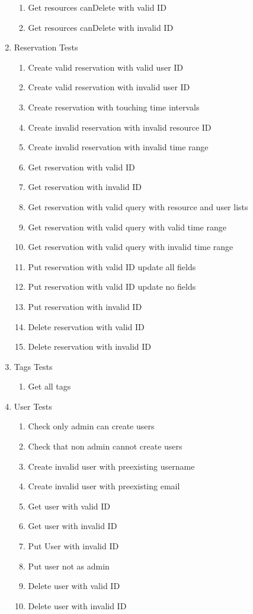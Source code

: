 \documentclass[12pt]{article}
\begin{document}
\begin{enumerate}
\begin{enumerate}
		\item Get resources canDelete with valid ID
		\item Get resources canDelete with invalid ID
	\end{enumerate}
	\item Reservation Tests
	\begin{enumerate}
		\item Create valid reservation with valid user ID
		\item Create valid reservation with invalid user ID
		\item Create reservation with touching time intervals
		\item Create invalid reservation with invalid resource ID
		\item Create invalid reservation with invalid time range
		\item Get reservation with valid ID
		\item Get reservation with invalid ID
		\item Get reservation with valid query with resource and user lists
		\item Get reservation with valid query with valid time range
		\item Get reservation with valid query with invalid time range
		\item Put reservation with valid ID update all fields
		\item Put reservation with valid ID update no fields
		\item Put reservation with invalid ID
		\item Delete reservation with valid ID
		\item Delete reservation with invalid ID
	\end{enumerate}
	\item Tags Tests
	\begin{enumerate}
		\item Get all tags
	\end{enumerate}
	\item User Tests
	\begin{enumerate}
		\item Check only admin can create users
		\item Check that non admin cannot create users
		\item Create invalid user with preexisting username
		\item Create invalid user with preexisting email 
		\item Get user with valid ID
		\item Get user with invalid ID
		\item Put User with invalid ID
		\item Put user not as admin
		\item Delete user with valid ID
		\item Delete user with invalid ID
	\end{enumerate}
\end{enumerate}
\end{document}
